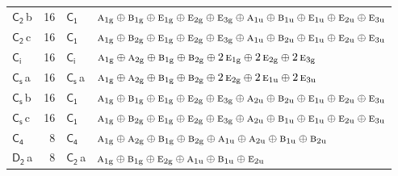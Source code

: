\documentclass[10pt,a4paper]{article}
\numberwithin{equation}{section}
\newcommand{\grp}[1]{\mathsf{#1}}
\newcommand{\irr}[1]{\text{\normalfont\scshape #1}}
\newcommand{\ptag}[1]{\mathrm{#1}}
\newcommand{\clsletter}[1]{\,{\scriptsize\color{black!55}#1}}
\newlength{\fillwidth}\newlength{\cellwidth}\newlength{\colwidth}
\begin{document}
{\begin{longtable}{@{}lrl>{\RaggedRight\arraybackslash}p{\fillwidth}@{}}
\href{C2.pdf}{$\grp{C_{2}}$}\clsletter{b} & 16 & \href{C1.pdf}{$\grp{C_{1}}$} & $\irr{a}_{1\ptag{g}}\oplus \irr{b}_{1\ptag{g}}\oplus \irr{e}_{1\ptag{g}}\oplus \irr{e}_{2\ptag{g}}\oplus \irr{e}_{3\ptag{g}}\oplus \irr{a}_{1\ptag{u}}\oplus \irr{b}_{1\ptag{u}}\oplus \irr{e}_{1\ptag{u}}\oplus \irr{e}_{2\ptag{u}}\oplus \irr{e}_{3\ptag{u}}$\\
\href{C2.pdf}{$\grp{C_{2}}$}\clsletter{c} & 16 & \href{C1.pdf}{$\grp{C_{1}}$} & $\irr{a}_{1\ptag{g}}\oplus \irr{b}_{2\ptag{g}}\oplus \irr{e}_{1\ptag{g}}\oplus \irr{e}_{2\ptag{g}}\oplus \irr{e}_{3\ptag{g}}\oplus \irr{a}_{1\ptag{u}}\oplus \irr{b}_{2\ptag{u}}\oplus \irr{e}_{1\ptag{u}}\oplus \irr{e}_{2\ptag{u}}\oplus \irr{e}_{3\ptag{u}}$\\
\href{S2.pdf}{$\grp{C_{i}}$} & 16 & \href{S2.pdf}{$\grp{C_{i}}$} & $\irr{a}_{1\ptag{g}}\oplus \irr{a}_{2\ptag{g}}\oplus \irr{b}_{1\ptag{g}}\oplus \irr{b}_{2\ptag{g}}\oplus 2\,\irr{e}_{1\ptag{g}}\oplus 2\,\irr{e}_{2\ptag{g}}\oplus 2\,\irr{e}_{3\ptag{g}}$\\
\href{C1v.pdf}{$\grp{C_{s}}$}\clsletter{a} & 16 & \href{C1v.pdf}{$\grp{C_{s}}$}\clsletter{a} & $\irr{a}_{1\ptag{g}}\oplus \irr{a}_{2\ptag{g}}\oplus \irr{b}_{1\ptag{g}}\oplus \irr{b}_{2\ptag{g}}\oplus 2\,\irr{e}_{2\ptag{g}}\oplus 2\,\irr{e}_{1\ptag{u}}\oplus 2\,\irr{e}_{3\ptag{u}}$\\
\href{C1v.pdf}{$\grp{C_{s}}$}\clsletter{b} & 16 & \href{C1.pdf}{$\grp{C_{1}}$} & $\irr{a}_{1\ptag{g}}\oplus \irr{b}_{1\ptag{g}}\oplus \irr{e}_{1\ptag{g}}\oplus \irr{e}_{2\ptag{g}}\oplus \irr{e}_{3\ptag{g}}\oplus \irr{a}_{2\ptag{u}}\oplus \irr{b}_{2\ptag{u}}\oplus \irr{e}_{1\ptag{u}}\oplus \irr{e}_{2\ptag{u}}\oplus \irr{e}_{3\ptag{u}}$\\
\href{C1v.pdf}{$\grp{C_{s}}$}\clsletter{c} & 16 & \href{C1.pdf}{$\grp{C_{1}}$} & $\irr{a}_{1\ptag{g}}\oplus \irr{b}_{2\ptag{g}}\oplus \irr{e}_{1\ptag{g}}\oplus \irr{e}_{2\ptag{g}}\oplus \irr{e}_{3\ptag{g}}\oplus \irr{a}_{2\ptag{u}}\oplus \irr{b}_{1\ptag{u}}\oplus \irr{e}_{1\ptag{u}}\oplus \irr{e}_{2\ptag{u}}\oplus \irr{e}_{3\ptag{u}}$\\
\href{C4.pdf}{$\grp{C_{4}}$} & 8 & \href{C4.pdf}{$\grp{C_{4}}$} & $\irr{a}_{1\ptag{g}}\oplus \irr{a}_{2\ptag{g}}\oplus \irr{b}_{1\ptag{g}}\oplus \irr{b}_{2\ptag{g}}\oplus \irr{a}_{1\ptag{u}}\oplus \irr{a}_{2\ptag{u}}\oplus \irr{b}_{1\ptag{u}}\oplus \irr{b}_{2\ptag{u}}$\\
\href{D2.pdf}{$\grp{D_{2}}$}\clsletter{a} & 8 & \href{C2.pdf}{$\grp{C_{2}}$}\clsletter{a} & $\irr{a}_{1\ptag{g}}\oplus \irr{b}_{1\ptag{g}}\oplus \irr{e}_{2\ptag{g}}\oplus \irr{a}_{1\ptag{u}}\oplus \irr{b}_{1\ptag{u}}\oplus \irr{e}_{2\ptag{u}}$\\

\end{longtable}}
\end{document}

